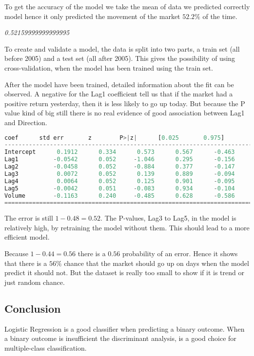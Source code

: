 To get the accuracy of the model we take the mean of data we predicted correctly model hence it only predicted the movement of the market $52.2\%$ of the time.

\noindent\textit{0.52159999999999995}

To create and validate a model, the data is split into two parts, a train set (all before 2005) and a test set (all after 2005). This gives the possibility of using cross-validation, when the model has been trained using the train set.

After the model have been trained, detailed information about the fit can be observed. A negative for the Lag1 coefficient tell us that if the market had a positive return yesterday, then it is less likely to go up today. But because the P value kind of big still there is no real evidence of good association between Lag1 and Direction.

\begin{lstlisting}[language=Python]
                coef      std err       z        P>|z|      [0.025       0.975]
------------------------------------------------------------------------------
Intercept      0.1912      0.334      0.573      0.567      -0.463       0.845
Lag1          -0.0542      0.052     -1.046      0.295      -0.156       0.047
Lag2          -0.0458      0.052     -0.884      0.377      -0.147       0.056
Lag3           0.0072      0.052      0.139      0.889      -0.094       0.108
Lag4           0.0064      0.052      0.125      0.901      -0.095       0.108
Lag5          -0.0042      0.051     -0.083      0.934      -0.104       0.096
Volume        -0.1163      0.240     -0.485      0.628      -0.586       0.353
==============================================================================
\end{lstlisting}

The error is still $1 - 0.48 = 0.52$. The P-values, Lag3 to Lag5, in the model is relatively high, by retraining the model without them. This should lead to a more efficient model. 

Because $1 - 0.44 = 0.56$ there is a $0.56$ probability of an error. Hence it shows that there is a $56\%$ chance that the market should go up on days when the model predict it should not. But the dataset is really too small to show if it is trend or just random chance.

\subsection{Conclusion}
Logistic Regression is a good classifier when predicting a binary outcome. When a binary outcome is insufficient the discriminant analysis, is a good choice for multiple-class classification.
